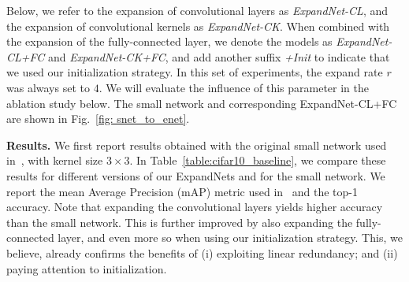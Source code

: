 \documentclass[10pt,twocolumn,letterpaper]{article}
\begin{document}
Below, we refer to the expansion of convolutional layers as {\it ExpandNet-CL}, and the expansion of convolutional kernels as {\it ExpandNet-CK}. When combined with the expansion of the fully-connected layer, we denote the models as {\it ExpandNet-CL+FC} and {\it ExpandNet-CK+FC}, and add another suffix {\it +Init} to indicate that we used our initialization strategy. In this set of experiments, the expand rate $r$ was always set to $4$. We will evaluate the influence of this parameter in the ablation study below.
The small network and corresponding ExpandNet-CL+FC are shown in Fig.~\ref{fig: snet_to_enet}.

\begin{table}[!t]
    \centering
    \vspace{0.01cm}
    \caption{\textbf{Small network with $3\times 3$ kernels vs ExpandNets on CIFAR-10.} Our approach yields consistently better results than the small network, particularly when expanding all layers and using our initialization strategy. }
  \label{table:cifar10_baseline}
\end{table}\vspace{0.2cm}\noindent\textbf{Results.}
We first report results obtained with the original small network used in~\cite{pkt_eccv}, with kernel size $3\times 3$.
In Table~\ref{table:cifar10_baseline}, we compare these results for different versions of our ExpandNets and for the small network. We report the mean Average Precision (mAP) metric used in~\cite{pkt_eccv} and the top-1 accuracy. Note that expanding the convolutional layers yields higher accuracy than the small network. This is further improved by also expanding the fully-connected layer, and even more so when using our initialization strategy. This, we believe, already confirms the benefits of (i) exploiting linear redundancy; and (ii) paying attention to initialization.
\end{document}
